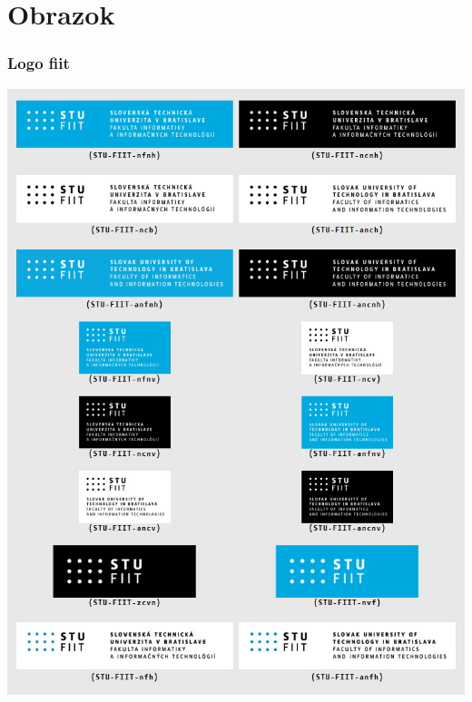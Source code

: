 \documentclass{beamer}
\begin{document}
\section{Obrazok}
\begin{frame}[fragile=singleslide]\frametitle{Logo fiit}

\includegraphics[width=\linewidth]{fiitLogo/nahlad.jpg}

\end{frame}
\end{document}

